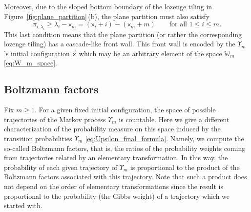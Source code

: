 \documentclass[pdftex]{sigma}
\numberwithin{equation}{section}
\begin{document}
Moreover, due to the sloped bottom boundary
of the lozenge tiling in Figure~\ref{fig:plane_partition}\,(b),
the plane partition must also satisfy
\begin{equation*}%
	\pi_{i,\lambda_i}\ge \lambda_i-\mathsf{x}_m
	=
	(\mathsf{x}_i+i)
	-(\mathsf{x}_m+m)
	\qquad \text{for all $1\le i\le m$}.
\end{equation*}
This last condition means that the plane partition
(or rather the corresponding lozenge tiling)
has a cascade-like front wall.
This front wall is encoded by the $\Upsilon_m$'s
initial configuration
$\vec{\mathsf{x}}$ which may be an arbitrary
element of the space $\mathbb{W}_m$
\eqref{eq:W_m_space}.

\subsection{Boltzmann factors}
\label{sub:Gibbs}

Fix $m\ge1$.
For a given fixed initial
configuration,
the space of possible trajectories
of the Markov process
$\Upsilon_m$
is countable.
Here we give a different
characterization of the probability measure
on this space
induced by the transition probabilities
$\Upsilon_m$ \eqref{eq:Upsilon_final_formula}.
Namely, we compute the so-called
Boltzmann factors, that is, the ratios of the
probability weights coming from trajectories related by
an elementary transformation. In this way,
the probability of each given trajectory of $\Upsilon_m$
is proportional to the product of the Boltzmann factors
associated with this trajectory.
Note that such a product
does not depend on the
order of elementary transformations since the
result is proportional to the probability
(the Gibbs weight)
of a trajectory
which we started with.
\end{document}
